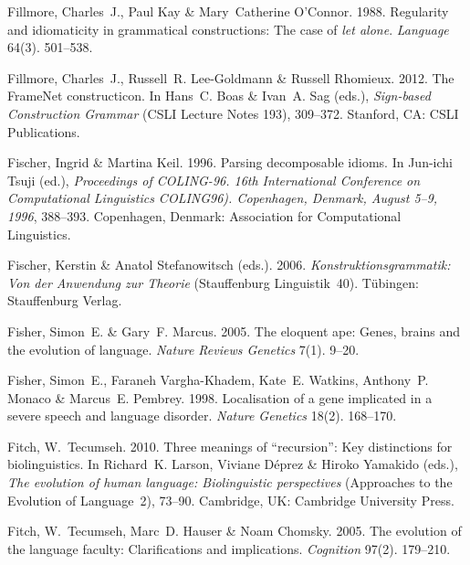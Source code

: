 \begin{thebibliography}{1420}
Fillmore, Charles~J., Paul Kay \& Mary~Catherine O'Connor. 1988.
\newblock Regularity and idiomaticity in grammatical constructions: {The} case
  of \emph{let alone}.
\newblock \emph{Language} 64(3). 501--538.

Fillmore, Charles~J., Russell~R. Lee-Goldmann \& Russell Rhomieux. 2012.
\newblock The {FrameNet} constructicon.
\newblock In Hans~C. Boas \& Ivan~A. Sag (eds.), \emph{{Sign-based Construction
  Grammar}} (CSLI Lecture Notes 193), 309--372. Stanford, CA: CSLI
  Publications.

Fischer, Ingrid \& Martina Keil. 1996.
\newblock Parsing decomposable idioms.
\newblock In {Jun-ichi} Tsuji (ed.), \emph{Proceedings of {COLING-96. 16th
  International Conference on Computational Linguistics COLING96). Copenhagen,
  Denmark, August 5--9, 1996}}, 388--393. Copenhagen, Denmark: Association for
  Computational Linguistics.

Fischer, Kerstin \& Anatol Stefanowitsch (eds.). 2006.
\newblock \emph{{Konstruktionsgrammatik: Von der Anwendung zur Theorie}}
  (Stauffenburg Linguistik~40).
\newblock T{\"u}bingen: Stauffenburg Verlag.

Fisher, Simon~E. \& Gary~F. Marcus. 2005.
\newblock The eloquent ape: Genes, brains and the evolution of language.
\newblock \emph{Nature Reviews Genetics} 7(1). 9--20.

Fisher, Simon~E., Faraneh Vargha-Khadem, Kate~E. Watkins, Anthony~P. Monaco \&
  Marcus~E. Pembrey. 1998.
\newblock Localisation of a gene implicated in a severe speech and language
  disorder.
\newblock \emph{Nature Genetics} 18(2). 168--170.

Fitch, W.~Tecumseh. 2010.
\newblock Three meanings of ``recursion'': Key distinctions for biolinguistics.
\newblock In Richard~K. Larson, Viviane D{\'e}prez \& Hiroko Yamakido (eds.),
  \emph{The evolution of human language: Biolinguistic perspectives}
  (Approaches to the Evolution of Language~2), 73--90. Cambridge, UK: Cambridge
  University Press.

Fitch, W.~Tecumseh, Marc~D. Hauser \& Noam Chomsky. 2005.
\newblock The evolution of the language faculty: Clarifications and
  implications.
\newblock \emph{Cognition} 97(2). 179--210.


\end{thebibliography}
